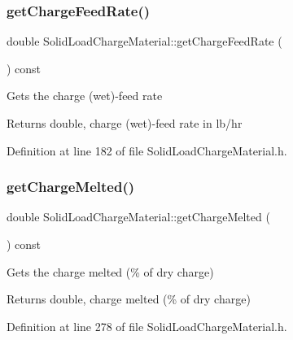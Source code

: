 \subsubsection{\texorpdfstring{get\+Charge\+Feed\+Rate()}{getChargeFeedRate()}\hspace{0.1cm}{\footnotesize\ttfamily [3/3]}}
{\footnotesize\ttfamily double Solid\+Load\+Charge\+Material\+::get\+Charge\+Feed\+Rate (\begin{DoxyParamCaption}{ }\end{DoxyParamCaption}) const\hspace{0.3cm}{\ttfamily [inline]}}

Gets the charge (wet)-\/feed rate \begin{DoxyReturn}{Returns}
double, charge (wet)-\/feed rate in lb/hr 
\end{DoxyReturn}


Definition at line 182 of file Solid\+Load\+Charge\+Material.\+h.

\mbox{\label{class_solid_load_charge_material_ad9ab52fe5861f48b763fe300851df69a}} 
\subsubsection{\texorpdfstring{get\+Charge\+Melted()}{getChargeMelted()}\hspace{0.1cm}{\footnotesize\ttfamily [1/3]}}
{\footnotesize\ttfamily double Solid\+Load\+Charge\+Material\+::get\+Charge\+Melted (\begin{DoxyParamCaption}{ }\end{DoxyParamCaption}) const\hspace{0.3cm}{\ttfamily [inline]}}

Gets the charge melted (\% of dry charge) \begin{DoxyReturn}{Returns}
double, charge melted (\% of dry charge) 
\end{DoxyReturn}


Definition at line 278 of file Solid\+Load\+Charge\+Material.\+h.

\mbox{\label{class_solid_load_charge_material_ad9ab52fe5861f48b763fe300851df69a}} 
